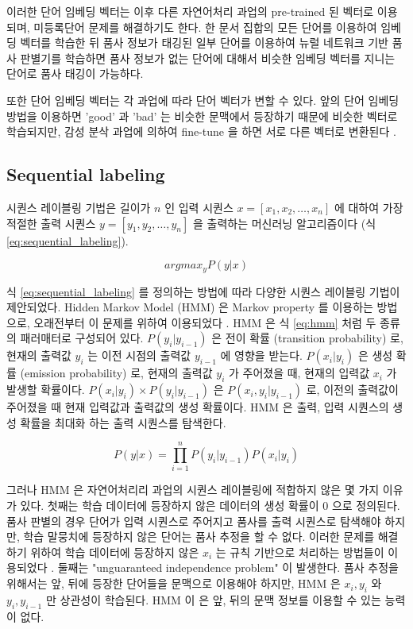 \documentclass[11pt]{article}
\begin{document}
이러한 단어 임베딩 벡터는 이후 다른 자연어처리 과업의 pre-trained 된 벡터로 이용되며, 미등록단어 문제를 해결하기도 한다.
한 문서 집합의 모든 단어를 이용하여 임베딩 벡터를 학습한 뒤 품사 정보가 태깅된 일부 단어를 이용하여 뉴럴 네트워크 기반 품사 판별기를 학습하면 품사 정보가 없는 단어에 대해서 비슷한 임베딩 벡터를 지니는 단어로 품사 태깅이 가능하다.

또한 단어 임베딩 벡터는 각 과업에 따라 단어 벡터가 변할 수 있다.
앞의 단어 임베딩 방법을 이용하면 'good' 과 'bad' 는 비슷한 문맥에서 등장하기 때문에 비슷한 벡터로 학습되지만, 감성 분삭 과업에 의하여 fine-tune 을 하면 서로 다른 벡터로 변환된다 \citep{kim2014convolutional, joulin2016bag}.

\subsection{Sequential labeling}

시퀀스 레이블링 기법은 길이가 $n$ 인 입력 시퀀스 $x = [x_1, x_2, \dots, x_n]$ 에 대하여 가장 적절한 출력 시퀀스 $y = [y_1, y_2, \dots, y_n]$ 을 출력하는 머신러닝 알고리즘이다 (식 \ref{eq:sequential_labeling}).

\begin{equation}
  \label{eq:sequential_labeling}
  argmax_y P(y \vert x)
\end{equation}

식 \ref{eq:sequential_labeling} 를 정의하는 방법에 따라 다양한 시퀀스 레이블링 기법이 제안되었다.
Hidden Markov Model (HMM) 은 Markov property 를 이용하는 방법으로, 오래전부터 이 문제를 위하여 이용되었다 \citep{krogh1994hidden}.
HMM 은 식 \ref{eq:hmm} 처럼 두 종류의 패러매터로 구성되어 있다.
$P(y_i \vert y_{i-1})$ 은 전이 확률 (transition probability) 로, 현재의 출력값 $y_i$ 는 이전 시점의 출력값 $y_{i-1}$ 에 영향을 받는다.
$P(x_i \vert y_i)$ 은 생성 확률 (emission probability) 로, 현재의 출력값 $y_i$ 가 주어졌을 때, 현재의 입력값 $x_i$ 가 발생할 확률이다.
$P(x_i \vert y_i) \times P(y_i \vert y_{i-1})$ 은 $P(x_i, y_i \vert y_{i-1})$ 로, 이전의 출력값이 주어졌을 때 현재 입력값과 출력값의 생성 확률이다.
HMM 은 출력, 입력 시퀀스의 생성 확률을 최대화 하는 출력 시퀀스를 탐색한다.

\begin{equation}
  \label{eq:hmm}
  P(y \vert x) = \prod_{i=1}^{n} P(y_i \vert y_{i-1}) P(x_i \vert y_i)
\end{equation}

그러나 HMM 은 자연어처리리 과업의 시퀀스 레이블링에 적합하지 않은 몇 가지 이유가 있다.
첫째는 학습 데이터에 등장하지 않은 데이터의 생성 확률이 0 으로 정의된다.
품사 판별의 경우 단어가 입력 시퀀스로 주어지고 품사를 출력 시퀀스로 탐색해야 하지만, 학습 말뭉치에 등장하지 않은 단어는 품사 추정을 할 수 없다.
이러한 문제를 해결하기 위하여 학습 데이터에 등장하지 않은 $x_i$ 는 규칙 기반으로 처리하는 방법들이 이용되었다 \citep{brants2000tnt}.
둘째는 "unguaranteed independence problem" 이 발생한다.
품사 추정을 위해서는 앞, 뒤에 등장한 단어들을 문맥으로 이용해야 하지만, HMM 은 $x_i, y_i$ 와 $y_i, y_{i-1}$ 만 상관성이 학습된다.
HMM 이 은 앞, 뒤의 문맥 정보를 이용할 수 있는 능력이 없다.
\end{document}
